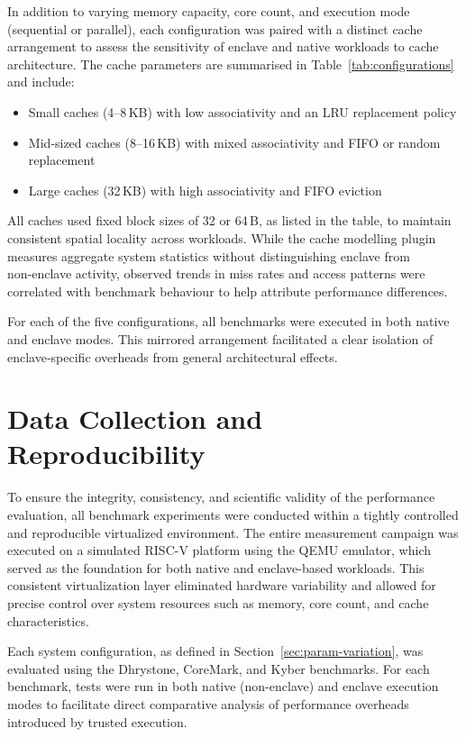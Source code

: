 In addition to varying memory capacity, core count, and execution mode (sequential or parallel), each configuration was paired with a distinct cache arrangement to assess the sensitivity of enclave and native workloads to cache architecture. The cache parameters are summarised in Table~\ref{tab:configurations} and include:

\begin{itemize}
    \item Small caches (4--8\,KB) with low associativity and an LRU replacement policy
    \item Mid‑sized caches (8--16\,KB) with mixed associativity and FIFO or random replacement
    \item Large caches (32\,KB) with high associativity and FIFO eviction
\end{itemize}

All caches used fixed block sizes of 32 or 64\,B, as listed in the table, to maintain consistent spatial locality across workloads. While the cache modelling plugin measures aggregate system statistics without distinguishing enclave from non‑enclave activity, observed trends in miss rates and access patterns were correlated with benchmark behaviour to help attribute performance differences.

For each of the five configurations, all benchmarks were executed in both native and enclave modes. This mirrored arrangement facilitated a clear isolation of enclave‑specific overheads from general architectural effects.

\section{Data Collection and Reproducibility}
\label{sec:data-collection}

To ensure the integrity, consistency, and scientific validity of the performance evaluation, all benchmark experiments were conducted within a tightly controlled and reproducible virtualized environment. The entire measurement campaign was executed on a simulated RISC-V platform using the QEMU emulator, which served as the foundation for both native and enclave-based workloads. This consistent virtualization layer eliminated hardware variability and allowed for precise control over system resources such as memory, core count, and cache characteristics.

Each system configuration, as defined in Section~\ref{sec:param-variation}, was evaluated using the Dhrystone, CoreMark, and Kyber benchmarks. For each benchmark, tests were run in both native (non-enclave) and enclave execution modes to facilitate direct comparative analysis of performance overheads introduced by trusted execution.

